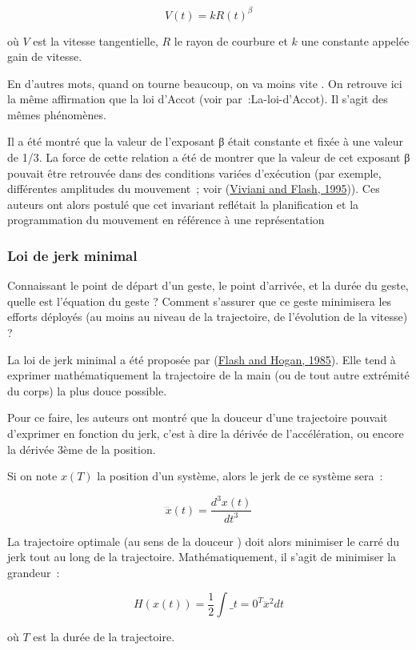 \documentclass[
]{book}
\begin{document}
\[
 V(t)=kR(t)^{\beta}\]

où \(V\) est la vitesse tangentielle, \(R\) le rayon de courbure et \(k\) une
constante appelée gain de vitesse.

En d'autres mots, quand on tourne beaucoup, on va moins vite . On retrouve
ici la même affirmation que la loi d'Accot (voir par~:La-loi-d'Accot). Il
s'agit des mêmes phénomènes.

Il a été montré que la valeur de l'exposant β était constante et fixée à
une valeur de 1/3. La force de cette relation a été de montrer que la valeur
de cet exposant β pouvait être retrouvée dans des conditions variées
d'exécution (par exemple, différentes amplitudes du mouvement~; voir (\protect\hyperlink{ref-viviani1995minimum}{Viviani and Flash, 1995})). Ces auteurs ont alors
postulé que cet invariant reflétait la planification et la programmation du
mouvement en référence à une représentation

\hypertarget{jerk}{%
\subsubsection{Loi de jerk minimal}\label{jerk}}

Connaissant le point de départ d'un geste, le point d'arrivée, et la durée
du geste, quelle est l'équation du geste ? Comment s'assurer que ce geste
minimisera les efforts déployés (au moins au niveau de la trajectoire, de
l'évolution de la vitesse) ?

La loi de jerk minimal a été proposée par (\protect\hyperlink{ref-flash1985coordination}{Flash and Hogan, 1985}). Elle tend à exprimer
mathématiquement la trajectoire de la main (ou de tout autre extrémité du
corps) la plus douce possible.

Pour ce faire, les auteurs ont montré que la douceur d'une trajectoire
pouvait d'exprimer en fonction du jerk, c'est à dire la dérivée de
l'accélération, ou encore la dérivée 3ème de la
position.

Si on note \(x(T)\) la
position d'un système, alors le jerk de ce système sera~:

\[
 \dddot{x}(t)=\frac{d^{3}x(t)}{dt^{3}}\]

La trajectoire optimale (au sens de la douceur ) doit alors minimiser le
carré du jerk tout au long de la trajectoire. Mathématiquement, il s'agit de
minimiser la grandeur~:

\[
 H(x(t))=\frac{1}{2}\int\_{t=0}^{T}\dddot{x}^{2}dt\]

où \(T\) est la durée de la trajectoire.
\end{document}
